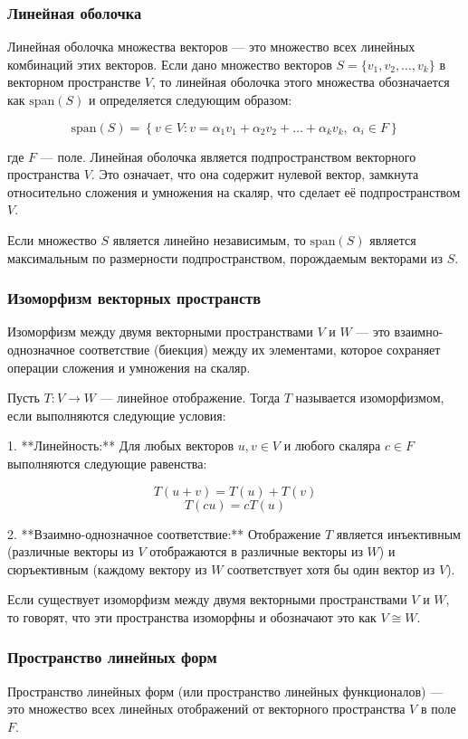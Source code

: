 \subsubsection*{Линейная оболочка}
Линейная оболочка множества векторов — это множество всех линейных комбинаций этих векторов. Если дано множество векторов $S = \{v_1, v_2, \ldots, v_k\}$ в векторном пространстве $V$, то линейная оболочка этого множества обозначается как $\text{span}(S)$ и определяется следующим образом:

\[
\text{span}(S) = \left\{v \in V: v = \alpha_1 v_1 + \alpha_2 v_2 + \ldots + \alpha_k v_k, \; \alpha_i \in F \right\}
\]

где $F$ — поле. Линейная оболочка является подпространством векторного пространства $V$. Это означает, что она содержит нулевой вектор, замкнута относительно сложения и умножения на скаляр, что сделает её подпространством $V$.

Если множество $S$ является линейно независимым, то $\text{span}(S)$ является максимальным по размерности подпространством, порождаемым векторами из $S$.

\subsubsection*{Изоморфизм векторных пространств}
Изоморфизм между двумя векторными пространствами $V$ и $W$ — это взаимно-однозначное соответствие (биекция) между их элементами, которое сохраняет операции сложения и умножения на скаляр.

Пусть $T: V \to W$ — линейное отображение. Тогда $T$ называется изоморфизмом, если выполняются следующие условия:

1. **Линейность:** Для любых векторов $u, v \in V$ и любого скаляра $c \in F$ выполняются следующие равенства:

   \[
   T(u + v) = T(u) + T(v)
   \]
   \[
   T(cu) = c T(u)
   \]

2. **Взаимно-однозначное соответствие:** Отображение $T$ является инъективным (различные векторы из $V$ отображаются в различные векторы из $W$) и сюръективным (каждому вектору из $W$ соответствует хотя бы один вектор из $V$).

Если существует изоморфизм между двумя векторными пространствами $V$ и $W$, то говорят, что эти пространства изоморфны и обозначают это как $V \cong W$. 

\subsubsection{Пространство линейных форм}
Пространство линейных форм (или пространство линейных функционалов) — это множество всех линейных отображений от векторного пространства $V$ в поле $F$.

